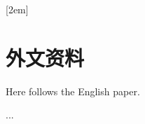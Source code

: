 
[2em]{\vspace{.5\baselineskip}\xiaosan\songti}%
             {\prechaptername\CJKnumber{\thecontentslabel}\postchaptername\qquad}{} %
             {}             %
\chapter*{外文资料}

Here follows the English paper.

...
